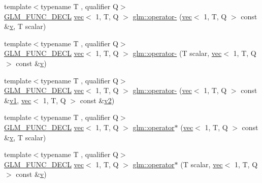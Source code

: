 \begin{DoxyCompactItemize}
\item 
{\footnotesize template$<$typename T , qualifier Q$>$ }\\\hyperlink{setup_8hpp_ab2d052de21a70539923e9bcbf6e83a51}{G\+L\+M\+\_\+\+F\+U\+N\+C\+\_\+\+D\+E\+CL} \hyperlink{structglm_1_1vec}{vec}$<$ 1, T, Q $>$ \hyperlink{group__ext__vec1_ga8069f3e0f8b424bda71c65bdadaaf73c}{glm\+::operator-\/} (\hyperlink{structglm_1_1vec}{vec}$<$ 1, T, Q $>$ const \&\hyperlink{_s_d_l__opengl_8h_a10a82eabcb59d2fcd74acee063775f90}{v}, T scalar)
\item 
{\footnotesize template$<$typename T , qualifier Q$>$ }\\\hyperlink{setup_8hpp_ab2d052de21a70539923e9bcbf6e83a51}{G\+L\+M\+\_\+\+F\+U\+N\+C\+\_\+\+D\+E\+CL} \hyperlink{structglm_1_1vec}{vec}$<$ 1, T, Q $>$ \hyperlink{group__ext__vec1_gad9a7982cee48942a4832b505993b7851}{glm\+::operator-\/} (T scalar, \hyperlink{structglm_1_1vec}{vec}$<$ 1, T, Q $>$ const \&\hyperlink{_s_d_l__opengl_8h_a10a82eabcb59d2fcd74acee063775f90}{v})
\item 
{\footnotesize template$<$typename T , qualifier Q$>$ }\\\hyperlink{setup_8hpp_ab2d052de21a70539923e9bcbf6e83a51}{G\+L\+M\+\_\+\+F\+U\+N\+C\+\_\+\+D\+E\+CL} \hyperlink{structglm_1_1vec}{vec}$<$ 1, T, Q $>$ \hyperlink{group__ext__vec1_gae339bd1ed8702767da0b5faacbc860ce}{glm\+::operator-\/} (\hyperlink{structglm_1_1vec}{vec}$<$ 1, T, Q $>$ const \&\hyperlink{_s_d_l__opengl__glext_8h_a435c176a02c061b43e19bdf7c86cceae}{v1}, \hyperlink{structglm_1_1vec}{vec}$<$ 1, T, Q $>$ const \&\hyperlink{_s_d_l__opengl__glext_8h_a0928f6d0f0f794ba000a21dfae422136}{v2})
\item 
{\footnotesize template$<$typename T , qualifier Q$>$ }\\\hyperlink{setup_8hpp_ab2d052de21a70539923e9bcbf6e83a51}{G\+L\+M\+\_\+\+F\+U\+N\+C\+\_\+\+D\+E\+CL} \hyperlink{structglm_1_1vec}{vec}$<$ 1, T, Q $>$ \hyperlink{group__ext__vec1_ga3831734bcbc3a7d64ddce316291d7a31}{glm\+::operator$\ast$} (\hyperlink{structglm_1_1vec}{vec}$<$ 1, T, Q $>$ const \&\hyperlink{_s_d_l__opengl_8h_a10a82eabcb59d2fcd74acee063775f90}{v}, T scalar)
\item 
{\footnotesize template$<$typename T , qualifier Q$>$ }\\\hyperlink{setup_8hpp_ab2d052de21a70539923e9bcbf6e83a51}{G\+L\+M\+\_\+\+F\+U\+N\+C\+\_\+\+D\+E\+CL} \hyperlink{structglm_1_1vec}{vec}$<$ 1, T, Q $>$ \hyperlink{group__ext__vec1_ga83636331813fdbfe423afc01de1f38aa}{glm\+::operator$\ast$} (T scalar, \hyperlink{structglm_1_1vec}{vec}$<$ 1, T, Q $>$ const \&\hyperlink{_s_d_l__opengl_8h_a10a82eabcb59d2fcd74acee063775f90}{v})

\end{DoxyCompactItemize}
